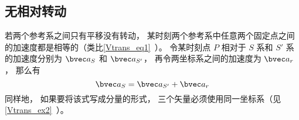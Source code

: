 

\subsection{无相对转动}
若两个参考系之间只有平移没有转动， 某时刻两个参考系中任意两个固定点之间的加速度都是相等的（类比\autoref{Vtrans_eq1}~）。 令某时刻点 $P$ 相对于 $S$ 系和 $S'$ 系的加速度分别为 $\bvec a_S$ 和 $\bvec a_{S'}$， 再令两坐标系之间的加速度为 $\bvec a_r$， 那么有
\begin{equation}\label{AccTra_eq1}
\bvec a_S = \bvec a_{S'} + \bvec a_r
\end{equation}
同样地， 如果要将该式写成分量的形式， 三个矢量必须使用同一坐标系（见\autoref{Vtrans_ex2}~）。

